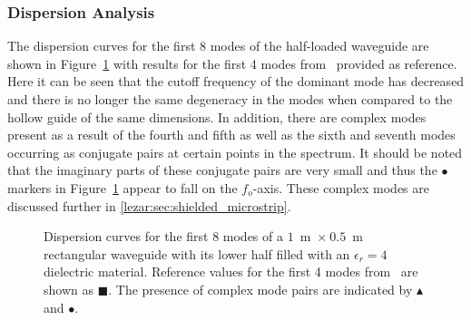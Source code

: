 \subsubsection{Dispersion Analysis}

The dispersion curves for the first 8 modes of the half-loaded
waveguide are shown in
Figure~\ref{lezar:fig:half_loaded_rectangular_dispersion_curves} with
results for the first 4 modes from~\cite{Jin2002} provided as
reference. Here it can be seen that the cutoff frequency of the
dominant mode has decreased and there is no longer the same degeneracy
in the modes when compared to the hollow guide of the same
dimensions. In addition, there are complex modes present as a result
of the fourth and fifth as well as the sixth and seventh modes
occurring as conjugate pairs at certain points in the spectrum. It
should be noted that the imaginary parts of these conjugate pairs are
very small and thus the $\bullet$ markers in
Figure~\ref{lezar:fig:half_loaded_rectangular_dispersion_curves} appear to
fall on the $f_o$-axis.  These complex modes are discussed further in
\ref{lezar:sec:shielded_microstrip}.
\begin{figure}
 \centering
 \caption{Dispersion curves for the first 8 modes of a $1$~m~$\times~0.5$~m rectangular waveguide with its lower half filled with an $\epsilon_r = 4$ dielectric material.  Reference values for the first 4 modes from~\cite{Jin2002} are shown as $\blacksquare$.  The presence of complex mode pairs are indicated by $\blacktriangle$ and $\bullet$.}
 \label{lezar:fig:half_loaded_rectangular_dispersion_curves}
\end{figure}
